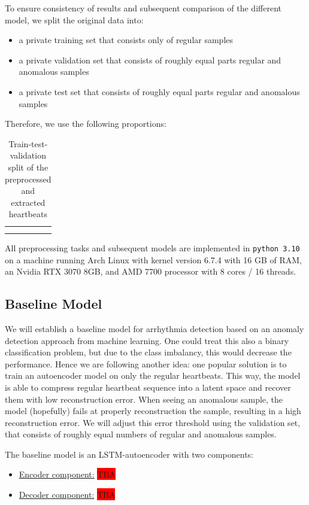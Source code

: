 To ensure consistency of results and subsequent comparison of the different model, we split the original data into:
\begin{itemize}
    \item a private training set that consists only of regular samples
    \item a private validation set that consists of roughly equal parts regular and anomalous samples
    \item a private test set that consists of roughly equal parts regular and anomalous samples
\end{itemize}

Therefore, we use the following proportions:

\begin{table}[H]
    \centering
    \begin{tabular}{c|c}
        & \\ 
        &
    \end{tabular}
    \caption{Train-test-validation split of the preprocessed and extracted heartbeats}
    \label{tab:train-test-val}
\end{table}

All preprocessing tasks and subsequent models are implemented in \texttt{python 3.10} on a machine running Arch Linux with kernel version 6.7.4 with 16 GB of RAM, an Nvidia RTX 3070 8GB, and AMD 7700 processor with 8 cores / 16 threads.

\subsection{Baseline Model}
We will establish a baseline model for arrhythmia detection based on an anomaly detection approach from machine learning. One could treat this also a binary classification problem, but due to the class imbalancy, this would decrease the performance. Hence we are following another idea: one popular solution is to train an autoencoder model on only the regular heartbeats. This way, the model is able to compress regular heartbeat sequence into a latent space and recover them with low reconstruction error. When seeing an anomalous sample, the model (hopefully) fails at properly reconstruction the sample, resulting in a high reconstruction error. We will adjust this error threshold using the validation set, that consists of roughly equal numbers of regular and anomalous samples.

The baseline model is an LSTM-autoencoder with two components:
\begin{itemize}
    \item \underline{Encoder component:} \colorbox{red}{TBA}
    \item \underline{Decoder component:} \colorbox{red}{TBA}
\end{itemize}

